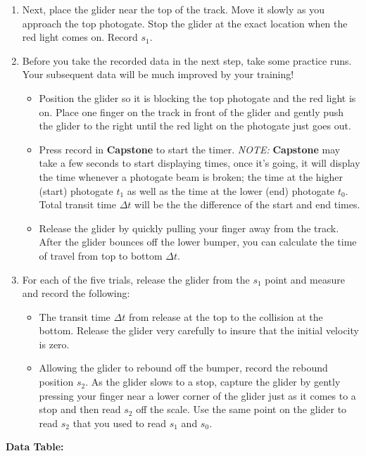 \begin{itemize}
\begin{enumerate}
  \item Next, place the glider near the top of the track. Move it slowly as you approach the top photogate. Stop the glider at the exact location when the red light comes on. Record $s_1$.
  \item Before you take the recorded data in the next step, take some practice runs. Your subsequent data will be much improved by your training!  %
  \begin{itemize}
      \item Position the glider so it is blocking the top photogate and the red light is on. Place one finger on the track in front of the glider and gently push the glider to the right until the red light on the photogate just goes out.
      \item Press record in \textbf{Capstone} to start the timer. \textit{NOTE: }\textbf{Capstone} may take a few seconds to start displaying times, once it's going, it will display the time whenever a photogate beam is broken; the time at the higher (start) photogate $t_1$ as well as the time at the lower (end) photogate $t_0$. Total transit time $\Delta t$ will be the the difference of the start and end times.
      \item Release the glider by quickly pulling your finger away from the track. After the glider bounces off the lower bumper, you can calculate the time of travel from top to bottom $\Delta t$.
  \end{itemize} 
    \item For each of the five trials, release the glider from the $s_1$ point and measure and record the following:
    \begin{itemize}
    \item The transit time $\Delta t$ from release at the top to the collision at the bottom.  Release the glider very carefully to insure that the initial velocity is zero.
    \item Allowing the glider to rebound off the bumper, record the rebound position $s_2$.  As the glider slows to a stop, capture the glider by gently pressing your finger near a lower corner of the glider just as it comes to a stop and then read $s_2$ off the scale.  Use the same point on the glider to read $s_2$ that you used to read $s_1$ and $s_0$.
    \end{itemize}
  \end{enumerate}
\end {itemize}

\textbf{Data Table:}

